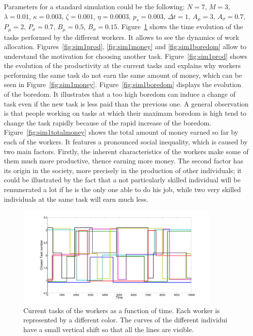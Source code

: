 Parameters for a standard simulation could be the following: $N=7$, $M=3$, $\lambda=0.01$, $\kappa=0.003$, $\zeta=0.001$, $\eta=0.0003$, $p_s=0.003$, $\Delta t=1$, $A_\mu=3$, $A_\sigma=0.7$, $P_\mu=2$, $P_\sigma=0.7$, $B_\mu=0.5$, $B_\sigma=0.15$. Figure~\ref{fig:sim1task} shows the time evolution of the tasks performed by the different workers. It allows to see the dynamics of work allocation. Figures~\ref{fig:sim1prod}, \ref{fig:sim1money} and \ref{fig:sim1boredom} allow to understand the motivation for choosing another task. Figure~\ref{fig:sim1prod} shows the evolution of the productivity at the current tasks and explains why workers performing the same task do not earn the same amount of money, which can be seen in Figure~\ref{fig:sim1money}. Figure~\ref{fig:sim1boredom} displays the evolution of the boredom. It illustrates that a too high boredom can induce a change of task even if the new task is less paid than the previous one. A general observation is that people working on tasks at which their maximam boredom is high tend to change the task rapidly because of the rapid increase of the boredom. Figure~\ref{fig:sim1totalmoney} shows the total amount of money earned so far by each of the workers. It features a pronounced social inequality, which is caused by two main factors. Firstly, the inherent characteristics of the workers make some of them much more productive, thence earning more money. The second factor has its origin in the society, more precisely in the production of other individuals; it could be illustrated by the fact that a not particularly skilled individual will be remunerated a lot if he is the only one able to do his job, while two very skilled individuals at the same task will earn much less.

\begin{figure}[h!]
	\centering
	\includegraphics[width=0.9\textwidth]{figures/taskno.pdf}
	\caption{Current tasks of the workers as a function of time. Each worker is represented by a different color. The curves of the different individui have a small vertical shift so that all the lines are visible.}
	\label{fig:sim1task}
\end{figure}

